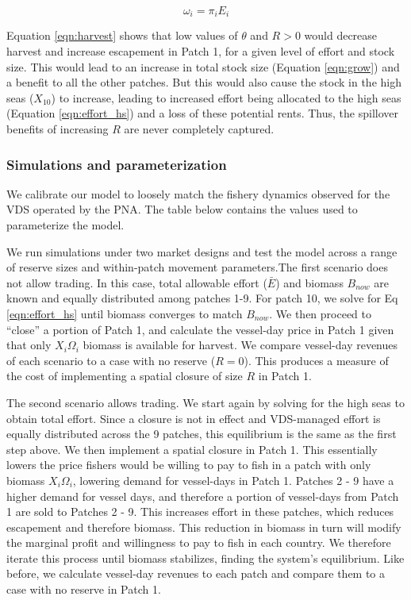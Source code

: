 \documentclass[12pt]{article}
\begin{document}
\begin{equation}
\omega_i = \pi_iE_i
\label{eqn:license_revenue}
\end{equation}

\noindent Equation \ref{eqn:harvest} shows that low values of $\theta$ and $R > 0$ would decrease harvest and increase escapement in Patch 1, for a given level of effort and stock size. This would lead to an increase in total stock size (Equation \ref{eqn:grow}) and a benefit to all the other patches. But this would also cause the stock in the high seas ($X_{10}$) to increase, leading to increased effort being allocated to the high seas (Equation \ref{eqn:effort_hs}) and a loss of these potential rents. Thus, the spillover benefits of increasing $R$ are never completely captured.

\subsubsection{Simulations and parameterization}

We calibrate our model to loosely match the fishery dynamics observed for the VDS operated by the PNA. The table below contains the values used to parameterize the model.



\noindent We run simulations under two market designs and test the model across a range of reserve sizes and within-patch movement parameters.The first scenario does not allow trading. In this case, total allowable effort ($\bar{E}$) and biomass $B_{now}$ are known and equally distributed among patches 1-9. For patch 10, we solve for Eq \ref{eqn:effort_hs} until biomass converges to match $B_{now}$. We then proceed to ``close'' a portion of Patch 1, and calculate the vessel-day price in Patch 1 given that only $X_i\Omega_i$ biomass is available for harvest. We compare vessel-day revenues of each scenario to a case with no reserve ($R = 0$). This produces a measure of the cost of implementing a spatial closure of size $R$ in Patch 1.

The second scenario allows trading. We start again by solving for the high seas to obtain total effort. Since a closure is not in effect and VDS-managed effort is equally distributed across the 9 patches, this equilibrium is the same as the first step above. We then implement a spatial closure in Patch 1. This essentially lowers the price fishers would be willing to pay to fish in a patch with only biomass $X_i\Omega_i$, lowering demand for vessel-days in Patch 1. Patches 2 - 9 have a higher demand for vessel days, and therefore a portion of vessel-days from Patch 1 are sold to Patches 2 - 9. This increases effort in these patches, which reduces escapement and therefore biomass. This reduction in biomass in turn will modify the marginal profit and willingness to pay to fish in each country. We therefore iterate this process until biomass stabilizes, finding the system's equilibrium. Like before, we calculate vessel-day revenues to each patch and compare them to a case with no reserve in Patch 1.
\end{document}
